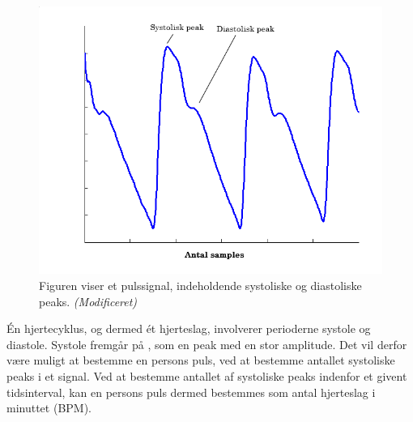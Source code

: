 \begin{figure}[H]
	\centering
	\includegraphics[scale=0.5]{figures/cDesign/puls_goldenstand.png}
	\caption{Figuren viser et pulssignal, indeholdende systoliske og diastoliske peaks. \citep{GanZahedi2011} \textit{(Modificeret)}}
	\label{fig:puls_goldenstand}
\end{figure}

Én hjertecyklus, og dermed ét hjerteslag, involverer perioderne systole og diastole. Systole fremgår på , som en peak med en stor amplitude. Det vil derfor være muligt at bestemme en persons puls, ved at bestemme antallet systoliske peaks i et signal. Ved at bestemme antallet af systoliske peaks indenfor et givent tidsinterval, kan en persons puls dermed bestemmes som antal hjerteslag i minuttet (BPM).


%
%
